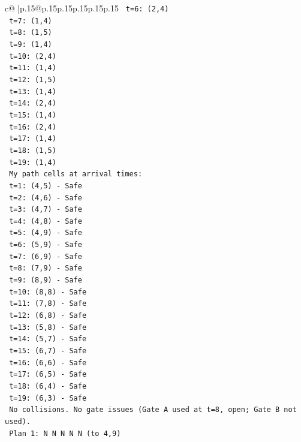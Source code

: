 \documentclass{article}
\begin{document}
{\begin{supertabular}{c@{$\;$}|p{.15\linewidth}@{}p{.15\linewidth}p{.15\linewidth}p{.15\linewidth}p{.15\linewidth}p{.15\linewidth}}
{{{\texttt{   t=6: (2,4)} \\
\texttt{   t=7: (1,4)} \\
\texttt{   t=8: (1,5)} \\
\texttt{   t=9: (1,4)} \\
\texttt{   t=10: (2,4)} \\
\texttt{   t=11: (1,4)} \\
\texttt{   t=12: (1,5)} \\
\texttt{   t=13: (1,4)} \\
\texttt{   t=14: (2,4)} \\
\texttt{   t=15: (1,4)} \\
\texttt{   t=16: (2,4)} \\
\texttt{   t=17: (1,4)} \\
\texttt{   t=18: (1,5)} \\
\texttt{   t=19: (1,4)} \\
\texttt{   My path cells at arrival times:} \\
\texttt{   t=1: (4,5) {-} Safe} \\
\texttt{   t=2: (4,6) {-} Safe} \\
\texttt{   t=3: (4,7) {-} Safe} \\
\texttt{   t=4: (4,8) {-} Safe} \\
\texttt{   t=5: (4,9) {-} Safe} \\
\texttt{   t=6: (5,9) {-} Safe} \\
\texttt{   t=7: (6,9) {-} Safe} \\
\texttt{   t=8: (7,9) {-} Safe} \\
\texttt{   t=9: (8,9) {-} Safe} \\
\texttt{   t=10: (8,8) {-} Safe} \\
\texttt{   t=11: (7,8) {-} Safe} \\
\texttt{   t=12: (6,8) {-} Safe} \\
\texttt{   t=13: (5,8) {-} Safe} \\
\texttt{   t=14: (5,7) {-} Safe} \\
\texttt{   t=15: (6,7) {-} Safe} \\
\texttt{   t=16: (6,6) {-} Safe} \\
\texttt{   t=17: (6,5) {-} Safe} \\
\texttt{   t=18: (6,4) {-} Safe} \\
\texttt{   t=19: (6,3) {-} Safe} \\
\texttt{   No collisions. No gate issues (Gate A used at t=8, open; Gate B not used).} \\
\texttt{   Plan 1: N N N N N (to 4,9)} \\
}}}
\end{supertabular}}
\end{document}
